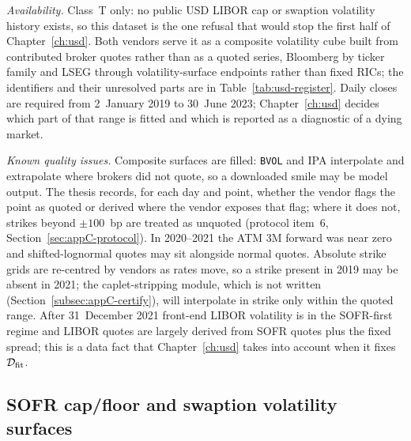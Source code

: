 \emph{Availability.} Class~T only: no public USD LIBOR cap or swaption volatility history exists, so this dataset is the one refusal that would stop the first half of Chapter~\ref{ch:usd}. Both vendors serve it as a composite volatility cube built from contributed broker quotes rather than as a quoted series, Bloomberg by ticker family and LSEG through volatility-surface endpoints rather than fixed RICs; the identifiers and their unresolved parts are in Table~\ref{tab:usd-register}. Daily closes are required from 2~January 2019 to 30~June 2023; Chapter~\ref{ch:usd} decides which part of that range is fitted and which is reported as a diagnostic of a dying market.

\emph{Known quality issues.} Composite surfaces are filled: \texttt{BVOL} and IPA interpolate and extrapolate where brokers did not quote, so a downloaded smile may be model output. The thesis records, for each day and point, whether the vendor flags the point as quoted or derived where the vendor exposes that flag; where it does not, strikes beyond $\pm100$~bp are treated as unquoted (protocol item~6, Section~\ref{sec:appC-protocol}). In 2020--2021 the ATM 3M forward was near zero and shifted-lognormal quotes may sit alongside normal quotes. Absolute strike grids are re-centred by vendors as rates move, so a strike present in 2019 may be absent in 2021; the caplet-stripping module, which is not written (Section~\ref{subsec:appC-certify}), will interpolate in strike only within the quoted range. After 31~December 2021 front-end LIBOR volatility is in the SOFR-first regime and LIBOR quotes are largely derived from SOFR quotes plus the fixed spread; this is a data fact that Chapter~\ref{ch:usd} takes into account when it fixes $\mathcal D_{\mathrm{fit}}$.



\subsection{SOFR cap/floor and swaption volatility surfaces}\label{appC:usd-sofr-vol}

